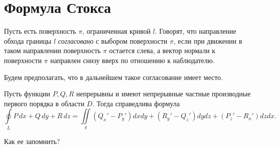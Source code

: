 \documentclass[../../main.tex]{subfiles}
\begin{document}
	\section{Формула Стокса}
	
	Пусть есть поверхность $\pi$, ограниченная кривой $l$. Говорят, что 
	направление обхода границы $l$ \emph{согласовано} с выбором поверхности 
	$\pi$, если при движении в таком направлении поверхность $\pi$ остается 
	слева, а вектор нормали к поверхности $\pi$ направлен снизу вверх по 
	отношению к наблюдателю.
	
	\begin{center}
		
	\end{center}
	
	Будем предполагать, что в дальнейшем такое согласование имеет место.
	
	\begin{thm}
		Пусть функции $P,Q,R$ непрерывны и имеют непрерывные частные производные 
		первого порядка в области $D$. Тогда справедлива формула
		\[\boxed{ \oint \limits_L P \, dx + Q \, dy + R \, dz = \iint \limits_{\pi} 
		\left( Q_x' - P_y'\right)dxdy + \left( R_y' - Q_z'\right)dydz + \left( P_z' 
		- R_x'\right)dzdx. }\]
	\end{thm}
	
		Как ее запомнить?
		
		\begin{center}
			
		\end{center}
		
\end{document}

